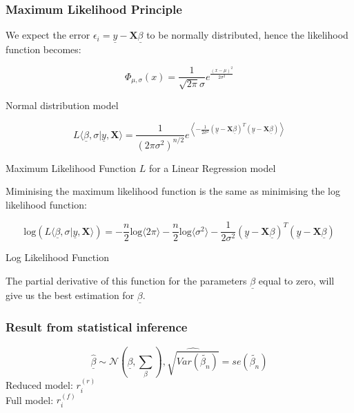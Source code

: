 \documentclass[11pt]{article}
\begin{document}
\subsubsection{Maximum Likelihood Principle}
We expect the error $\epsilon_i = \underline{y} - \textbf{X}\underline{\beta}$ to be normally distributed, hence the likelihood function becomes:
\begin{equ}[H]
	\begin{equation*}
		\Phi_{\mu, \sigma}(x) = \frac{1}{\sqrt{2\pi}\sigma}e^{\frac{(x-\mu)^2}{2\sigma^2}}
	\end{equation*}
	\caption{Normal distribution model}
\end{equ}

\begin{equ}[H]
	\begin{equation*}
		L\langle \underline{\beta},\sigma | \underline{y}, \textbf{X}\rangle = \frac{1}{(2\pi\sigma^2)^{n/2}}e^{\left\langle-\frac{1}{2\sigma^2}(\underline{y}-\textbf{X}\underline{\beta})^T(\underline{y}-\textbf{X}\underline{\beta})\right\rangle}
	\end{equation*}
	\caption{Maximum Likelihood Function $L$ for a Linear Regression model}
\end{equ}

Miminising the maximum likelihood function is the same as minimising the log likelihood function:

\begin{equ}[H]
	\begin{equation*}
		\text{log}(L\langle \underline{\beta},\sigma | \underline{y}, \textbf{X}\rangle) = -\frac{n}{2}\text{log}\langle2\pi\rangle -\frac{n}{2}\text{log}\langle\sigma^2\rangle -\frac{1}{2\sigma^2}(\underline{y}-\textbf{X}\underline{\beta})^T(\underline{y}-\textbf{X}\underline{\beta})
	\end{equation*}
	\caption{Log Likelihood Function}
\end{equ}

The partial derivative of this function for the parameters $\underline{\beta}$ equal to zero, will give us the best estimation for $\underline{\beta}$.


\subsubsection{Result from statistical inference}

\begin{equation*}
    \underline{\widehat{\beta}} \sim \mathcal{N}(\underline{\beta},\sum_\beta), \widehat{\sqrt{Var(\tilde{\beta_n})}} = se(\tilde{\beta_n})
\end{equation*}
\noindent
Reduced model: $r_i^{(r)}$
\\
Full model: $r_i^{(f)}$
\end{document}
